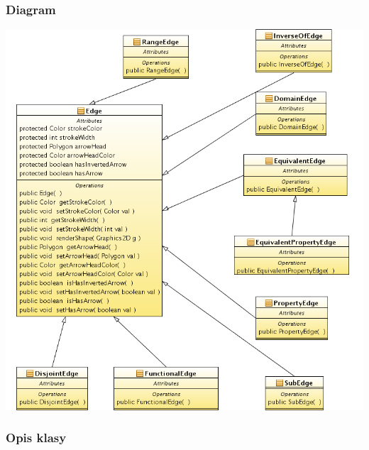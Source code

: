 \subsubsection{Diagram}

\includegraphics[width=\linewidth]{./modelowanie/OV_UML/EdgeClassDiagram.png}

\subsubsection{Opis klasy}

